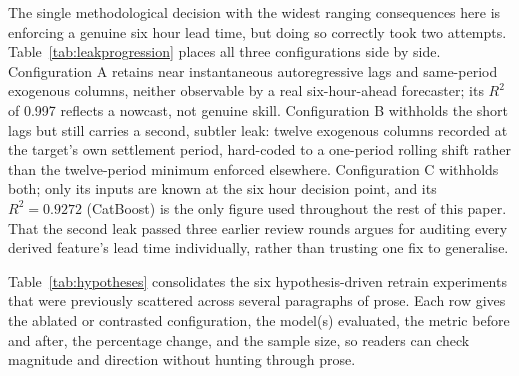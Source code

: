 \documentclass[runningheads]{llncs}
\begin{document}
The single methodological decision with the widest ranging consequences here is enforcing a genuine six hour lead time, but doing so correctly took two attempts. Table~\ref{tab:leakprogression} places all three configurations side by side. Configuration A retains near instantaneous autoregressive lags and same-period exogenous columns, neither observable by a real six-hour-ahead forecaster; its $R^2$ of 0.997 reflects a nowcast, not genuine skill. Configuration B withholds the short lags but still carries a second, subtler leak: twelve exogenous columns recorded at the target's own settlement period, hard-coded to a one-period rolling shift rather than the twelve-period minimum enforced elsewhere. Configuration C withholds both; only its inputs are known at the six hour decision point, and its $R^2=0.9272$ (CatBoost) is the only figure used throughout the rest of this paper. That the second leak passed three earlier review rounds argues for auditing every derived feature's lead time individually, rather than trusting one fix to generalise.

\begin{table}[H]
\centering
\small
\caption{Three configurations of the same pipeline: each successive horizon-consistency fix lowers $R^2$ while raising its trustworthiness. ``Known at $t-12$'' marks whether every input is actually available six hours before the target. The champion model differs across rows since each fix changed which estimator scored best; A is recorded from the project log rather than a currently reproducible artefact (its feature file predates the fixes in Section~\ref{sec:featureeng} and was not retained).}
\label{tab:leakprogression}
\end{table}

Table~\ref{tab:hypotheses} consolidates the six hypothesis-driven retrain experiments that were previously scattered across several paragraphs of prose. Each row gives the ablated or contrasted configuration, the model(s) evaluated, the metric before and after, the percentage change, and the sample size, so readers can check magnitude and direction without hunting through prose.
\end{document}
